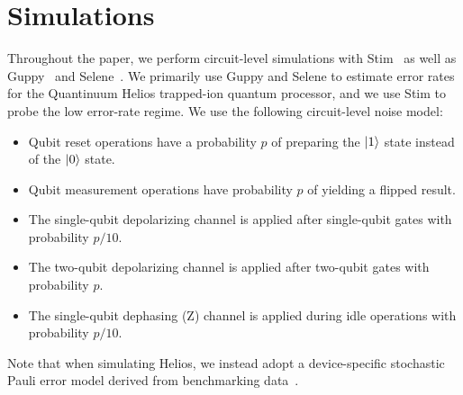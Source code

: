 \section{Simulations}
\label{apx:simulations}

Throughout the paper, we perform circuit-level simulations with Stim~\cite{Gidney_2021} as well as Guppy~\cite{koch2025} and Selene~\cite{selene_2025}. We primarily use Guppy and Selene to estimate error rates for the Quantinuum Helios trapped-ion quantum processor, and we use Stim to probe the low error-rate regime. We use the following circuit-level noise model:
\begin{itemize}
    \item Qubit reset operations have a probability $p$ of preparing the $\ket{1}$ state instead of the $\ket{0}$ state.
    \item Qubit measurement operations have probability $p$ of yielding a flipped result.
    \item The single-qubit depolarizing channel is applied after single-qubit gates with probability $p/10$.
    \item The two-qubit depolarizing channel is applied after two-qubit gates with probability $p$.
    \item The single-qubit dephasing (Z) channel is applied during idle operations with probability $p/10$.
\end{itemize}
Note that when simulating Helios, we instead adopt a device-specific stochastic Pauli error model derived from  benchmarking data~\cite{Ransford2026}.

